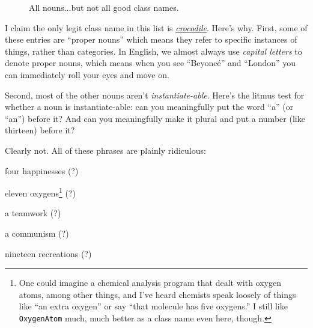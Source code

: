 \setlength{\fboxsep}{1pt}
\begin{figure}[hb]
\centering
{}
\vspace{.1in}
\caption{All nouns...but not all good class names.}
\label{fig:nouns}
\end{figure}

I claim the only legit class name in this list is
\underline{\textit{crocodile}}. Here's why. First, some of these entries are
``proper nouns'' which means they refer to specific instances of things, rather
than categories. In English, we almost always use \textit{capital letters} to
denote proper nouns, which means when you see ``Beyonc\'{e}'' and ``London''
you can immediately roll your eyes and move on.

\label{instantiation}
Second, most of the other nouns aren't \textit{instantiate-able}. Here's the
litmus test for whether a noun is instantiate-able: can you meaningfully
put the word ``a'' (or ``an'') before it? And can you meaningfully make it
plural and put a number (like thirteen) before it?

Clearly not. All of these phrases are plainly ridiculous:

\begin{multicols}{2}
\begin{compactitem}
\item four happinesses (?)
\item eleven oxygens\footnote{One could imagine a chemical analysis program
that dealt with oxygen atoms, among other things, and I've heard chemists
speak loosely of things like ``an extra oxygen'' or say ``that molecule has
five oxygens.'' I still like \texttt{OxygenAtom} much, much better as a class
name even here, though.} (?)
\item a teamwork (?)
\columnbreak
\item a communism (?)
\item nineteen recreations (?)
\end{compactitem}
\end{multicols}

